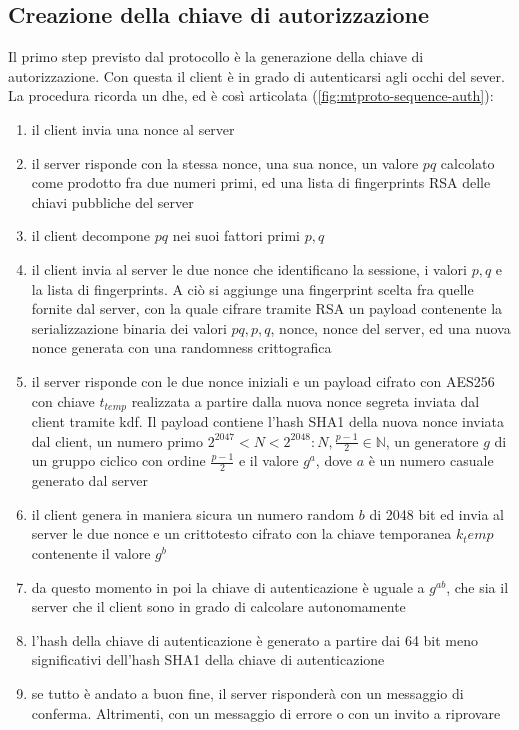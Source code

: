 \subsection{Creazione della chiave di autorizzazione}
Il primo step previsto dal protocollo è la generazione della chiave di autorizzazione.
Con questa il client è in grado di autenticarsi agli occhi del sever. \\
La procedura ricorda un \gls{dhe}, ed è così articolata (\autoref{fig:mtproto-sequence-auth}):
\begin{enumerate}
    \item il client invia una nonce al server
    \item il server risponde con la stessa nonce, una sua nonce, un valore $pq$ calcolato come prodotto fra due numeri primi,
          ed una lista di fingerprints RSA delle chiavi pubbliche del server
    \item il client decompone $pq$ nei suoi fattori primi $p, q$
    \item il client invia al server le due nonce che identificano la sessione, i valori $p, q$ e la lista di fingerprints.
          A ciò si aggiunge una fingerprint scelta fra quelle fornite dal server, con la quale cifrare tramite RSA un payload contenente
          la serializzazione binaria dei valori $pq, p, q$, nonce, nonce del server, ed una nuova nonce generata con una randomness crittografica
    \item il server risponde con le due nonce iniziali e un payload cifrato con AES256 con chiave $t_{temp}$ realizzata a partire dalla nuova nonce segreta inviata dal client tramite \gls{kdf}.
          Il payload contiene l'hash SHA1 della nuova nonce inviata dal client,
          un numero primo $2^{2047} < N < 2^{2048} : N, \frac{p-1}{2} \in \mathbb{N}$, un generatore $g$ di un gruppo ciclico con ordine $\frac{p-1}{2}$ e il valore $g^a$,
          dove $a$ è un numero casuale generato dal server
    \item il client genera in maniera sicura un numero random $b$ di 2048 bit ed invia al server le due nonce e un crittotesto
          cifrato con la chiave temporanea ${k_temp}$ contenente il valore $g^b$
    \item da questo momento in poi la chiave di autenticazione è uguale a $g^{ab}$, che sia il server che il client sono in grado di calcolare autonomamente
    \item l'hash della chiave di autenticazione è generato a partire dai 64 bit meno significativi dell'hash SHA1 della chiave di autenticazione
    \item se tutto è andato a buon fine, il server risponderà con un messaggio di conferma. Altrimenti, con un messaggio di errore o con un invito a riprovare
\end{enumerate}

